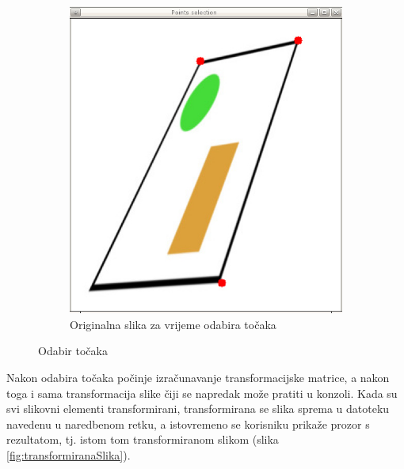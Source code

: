 \begin{figure}[ht]
\begin{subfigure}{0.45\textwidth}
\begin{minipage}{0.9\textwidth}
	\includegraphics[width=\textwidth]{figures/points_selection_selected.jpg}
	\caption{Originalna slika za vrijeme odabira točaka}
	\label{fig:odabirTocaka2}
\end{minipage}
\end{subfigure}

\caption{Odabir točaka}
\label{fig:odabirTocaka}

\end{figure}

Nakon odabira točaka počinje izračunavanje transformacijske matrice, a nakon toga i sama transformacija slike čiji se napredak može pratiti u konzoli. Kada su svi slikovni elementi transformirani, transformirana se slika sprema u datoteku navedenu u naredbenom retku, a istovremeno se korisniku prikaže prozor s rezultatom, tj. istom tom transformiranom slikom (slika \ref{fig:transformiranaSlika}).

